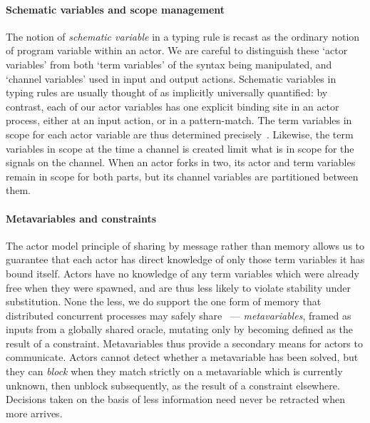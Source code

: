 \documentclass{easychair}
\begin{document}
\paragraph{Schematic variables and scope management}
The notion of \emph{schematic variable} in a typing rule is recast as
the ordinary notion of program variable within an actor. We are
careful to distinguish these `actor variables' from both `term
variables' of the syntax being manipulated, %
and `channel variables' used in input and output actions. Schematic
variables in typing rules are usually thought of as implicitly
universally quantified: by contrast, each of our actor variables has
one explicit binding site in an actor process, either at an input
action, or in a pattern-match. %
The term variables in scope for each actor variable are
thus determined precisely~\cite{codebruijn}.
Likewise, the term variables in scope at
the time a channel is created limit what is in scope for the signals
on the channel. When an actor forks in two, its actor and term
variables remain in scope for both parts, but its channel variables
are partitioned between them.


\paragraph{Metavariables and constraints}
The actor model principle of sharing by message rather than memory
allows us to guarantee that each actor has direct knowledge of only
those term variables it has bound itself. Actors have no knowledge of
any term variables which were already free when they were spawned, and
are thus less likely to violate stability under substitution.
%
None the less, we do support the one form of memory that distributed
concurrent processes may safely share~\cite{kuper2015theses} --- \emph{metavariables}, framed
as inputs from a globally shared oracle, mutating only by becoming
defined as the result of a constraint. Metavariables thus provide a
secondary means for actors to communicate. Actors cannot detect
whether a metavariable has been solved, but they can \emph{block} when
they match strictly on a metavariable which is currently unknown, then
unblock subsequently, as the result of a constraint
elsewhere. Decisions taken on the basis of less information need
never be retracted when more arrives.
\end{document}
